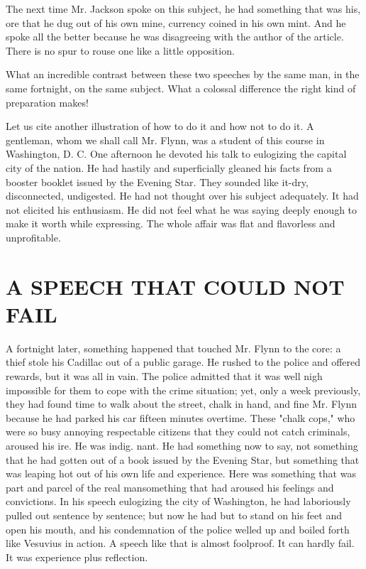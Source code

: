 \documentclass[10pt]{article}
\begin{document}
The next time Mr. Jackson spoke on this subject, he had something that was his, ore that he dug out of his own mine, currency coined in his own mint. And he spoke all the better because he was disagreeing with the author of the article. There is no spur to rouse one like a little opposition.

What an incredible contrast between these two speeches by the same man, in the same fortnight, on the same subject. What a colossal difference the right kind of preparation makes!

Let us cite another illustration of how to do it and how not to do it. A gentleman, whom we shall call Mr. Flynn, was a student of this course in Washington, D. C. One afternoon he devoted his talk to eulogizing the capital city of the nation. He had hastily and superficially gleaned his facts from a booster booklet issued by the Evening Star. They sounded like it-dry, disconnected, undigested. He had not thought over his subject adequately. It had not elicited his enthusiasm. He did not feel what he was saying deeply enough to make it worth while expressing. The whole affair was flat and flavorless and unprofitable.

\section*{A SPEECH THAT COULD NOT FAIL}
A fortnight later, something happened that touched Mr. Flynn to the core: a thief stole his Cadillac out of a public garage. He rushed to the police and offered rewards, but it was all in vain. The police admitted that it was well nigh impossible for them to cope with the crime situation; yet, only a week previously, they had found time to walk about the street, chalk in hand, and fine Mr. Flynn because he had parked his car fifteen minutes overtime. These "chalk cops," who were so busy annoying respectable citizens that they could not catch criminals, aroused his ire. He was indig. nant. He had something now to say, not something that he had gotten out of a book issued by the Evening Star, but something that was leaping hot out of his own life and experience. Here was something that was part and parcel of the real mansomething that had aroused his feelings and convictions. In his speech eulogizing the city of Washington, he had laboriously pulled out sentence by sentence; but now he had but to stand on his feet and open his mouth, and his condemnation of the police welled up and boiled forth like Vesuvius in action. A speech like that is almost foolproof. It can hardly fail. It was experience plus reflection.
\end{document}
